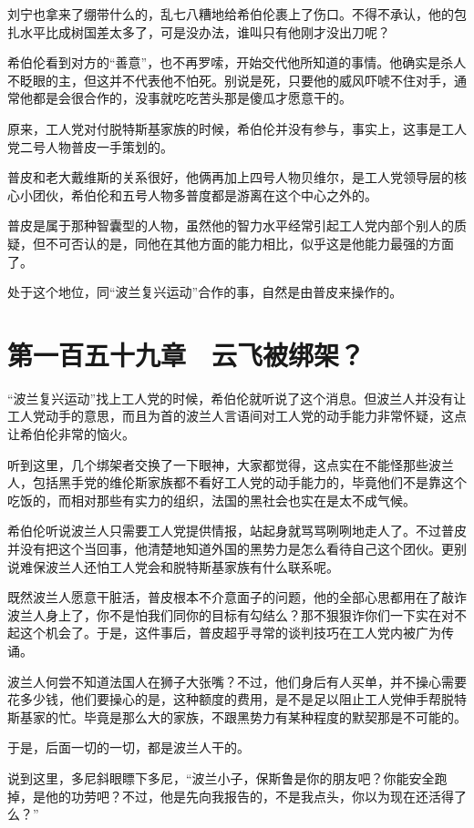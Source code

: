 刘宁也拿来了绷带什么的，乱七八糟地给希伯伦裹上了伤口。不得不承认，他的包扎水平比成树国差太多了，可是没办法，谁叫只有他刚才没出刀呢？

希伯伦看到对方的“善意”，也不再罗嗦，开始交代他所知道的事情。他确实是杀人不眨眼的主，但这并不代表他不怕死。别说是死，只要他的威风吓唬不住对手，通常他都是会很合作的，没事就吃吃苦头那是傻瓜才愿意干的。

原来，工人党对付脱特斯基家族的时候，希伯伦并没有参与，事实上，这事是工人党二号人物普皮一手策划的。

普皮和老大戴维斯的关系很好，他俩再加上四号人物贝维尔，是工人党领导层的核心小团伙，希伯伦和五号人物多普度都是游离在这个中心之外的。

普皮是属于那种智囊型的人物，虽然他的智力水平经常引起工人党内部个别人的质疑，但不可否认的是，同他在其他方面的能力相比，似乎这是他能力最强的方面了。

处于这个地位，同“波兰复兴运动”合作的事，自然是由普皮来操作的。

\section{第一百五十九章　云飞被绑架？}

“波兰复兴运动”找上工人党的时候，希伯伦就听说了这个消息。但波兰人并没有让工人党动手的意思，而且为首的波兰人言语间对工人党的动手能力非常怀疑，这点让希伯伦非常的恼火。

听到这里，几个绑架者交换了一下眼神，大家都觉得，这点实在不能怪那些波兰人，包括黑手党的维伦斯家族都不看好工人党的动手能力的，毕竟他们不是靠这个吃饭的，而相对那些有实力的组织，法国的黑社会也实在是太不成气候。

希伯伦听说波兰人只需要工人党提供情报，站起身就骂骂咧咧地走人了。不过普皮并没有把这个当回事，他清楚地知道外国的黑势力是怎么看待自己这个团伙。更别说难保波兰人还怕工人党会和脱特斯基家族有什么联系呢。

既然波兰人愿意干脏活，普皮根本不介意面子的问题，他的全部心思都用在了敲诈波兰人身上了，你不是怕我们同你的目标有勾结么？那不狠狠诈你们一下实在对不起这个机会了。于是，这件事后，普皮超乎寻常的谈判技巧在工人党内被广为传诵。

波兰人何尝不知道法国人在狮子大张嘴？不过，他们身后有人买单，并不操心需要花多少钱，他们要操心的是，这种额度的费用，是不是足以阻止工人党伸手帮脱特斯基家的忙。毕竟是那么大的家族，不跟黑势力有某种程度的默契那是不可能的。

于是，后面一切的一切，都是波兰人干的。

说到这里，多尼斜眼瞟下多尼，“波兰小子，保斯鲁是你的朋友吧？你能安全跑掉，是他的功劳吧？不过，他是先向我报告的，不是我点头，你以为现在还活得了么？”

